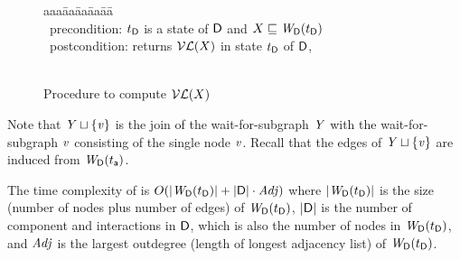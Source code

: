 \begin{figure}[H]
\setcounter{lctr}{0}
\begin{tabbing}\label{alg:compute-lfp}
aaa\= aa\= aa\= aa\= aa\=\kill
{}\\
\cmnt\ precondition: $\tD$ is a state of $\dsk{\act}{\l}$ and $X \subg \lwfg{\B}{\tD}{\dsk{\act}{\l}}$\\
\cmnt\ postcondition: returns $\lVF{X}$ in state $t_\DS$ of $\dsk{\act}{\l}$,\\
\\
\lio{\YS \gts \ewfg}

\lio{\FORALLC{\ndv \in \dsk{\act}{\l}}}




    \lit{\FI}
\lio{\ENDFOR;}
\lion{\RETURNE{\YS}}
\end{tabbing}
\caption{Procedure to compute $\lVF{X}$}
\label{fig:algcomputeVL}
\end{figure}

Note that $\YS \join \set{\ndv}$ is the join of the wait-for-subgraph $\YS$ with the 
wait-for-subgraph $\ndv$ consisting of the single node $\ndv$. Recall
that the edges of $\YS \join \set{\ndv}$ are induced from $\lwfg{B}{t_\act}{\DS}$.

The time complexity of \cVL{$\DS, \tD, \XS$} is 
$O(\card{\lwfg{\B}{\tD}{\DS}} + \card{\DS} \mult \Adj)$
where
$\card{\lwfg{\B}{\tD}{\DS}}$ is the size (number of nodes plus number of edges) of $\lwfg{\B}{\tD}{\DS}$,
$\card{\DS}$ is the number of component and interactions in $\dsk{\act}{\l}$, which is also the number of nodes in $\lwfg{\B}{\tD}{\DS}$,
and
$\Adj$ is the largest outdegree (\ie length of longest adjacency list) of $\lwfg{\B}{\tD}{\DS}$.

